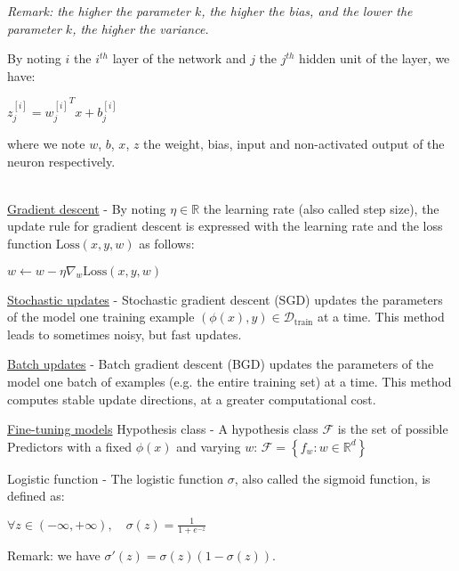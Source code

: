 \documentclass[4pt,landscape]{article}
\begin{document}
\begin{multicols*}{4}
{\tiny \textit{Remark: the higher the parameter $k$, the higher the bias, and the lower the parameter $k$, the higher the variance.}}\par

{\tiny By noting $i$ the $i^{th}$ layer of the network and $j$ the $j^{th}$ hidden unit of the layer, we have:}\par
\tiny ${z_j^{[i]}={w_j^{[i]}}^Tx+b_j^{[i]}}$

{where we note $w$, $b$, $x$, $z$ the weight, bias, input and non-activated output of the neuron respectively.}\par

{\color{black}\hrulefill}\\
{\underline{Gradient descent} - By noting $\eta\in\mathbb{R}$ the learning rate (also called step size), the update rule for gradient descent is expressed with the learning rate and the loss function $\textrm{Loss}(x,y,w)$ as follows:}\par

\tiny${w\longleftarrow w-\eta\nabla_w \textrm{Loss}(x,y,w)}$

{\underline{Stochastic updates} - Stochastic gradient descent (SGD) updates the parameters of the model one training example \tiny $(\phi(x),y)\in\mathcal{D}_{\textrm{train}}$ at a time. This method leads to sometimes noisy, but fast updates.}\par

{\underline{Batch updates} - Batch gradient descent (BGD) updates the parameters of the model one batch of examples (e.g. the entire training set) at a time. This method computes stable update directions, at a greater computational cost.}\par

\underline{Fine-tuning models}
{\tiny Hypothesis class - A hypothesis class $\mathcal{F}$ is the set of possible Predictors with a fixed $\phi(x)$ and varying $w$: $\mathcal{F}=\left\{f_w:w\in\mathbb{R}^d\right\}$}\par


{Logistic function - The logistic function \tiny $\sigma$, also called the sigmoid function, is defined as:}\par

{\tiny ${\forall z\in(-\infty,+\infty),\quad\sigma(z)=\frac{1}{1+e^{-z}}}$}

{Remark: we have \tiny $\sigma'(z)=\sigma(z)(1-\sigma(z))$.}\par


\end{multicols*}
\end{document}
